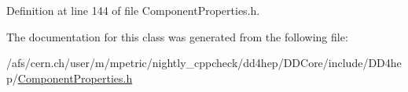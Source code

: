 Definition at line 144 of file Component\+Properties.\+h.



The documentation for this class was generated from the following file\+:\begin{DoxyCompactItemize}
\item 
/afs/cern.\+ch/user/m/mpetric/nightly\+\_\+cppcheck/dd4hep/\+D\+D\+Core/include/\+D\+D4hep/\hyperlink{_component_properties_8h}{Component\+Properties.\+h}\end{DoxyCompactItemize}

